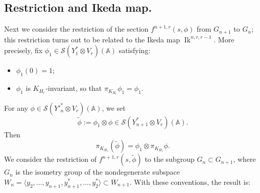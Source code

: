 \documentclass[10pt]{amsart}
\theoremstyle{plain}
\numberwithin{equation}{section}
\begin{document}
 \subsection{\bf Restriction and Ikeda map.}
Next we consider the restriction of the section $f^{n+1,r}(s, \phi)$
from $G_{n+1}$ to $G_n$; this restriction turns out
 to be related to the Ikeda map ${\operatorname{Ik}}^{n,r,r-1}$.
 More precisely, fix $\phi_1  \in \mathcal{S}(Y_1^* \otimes V_r)({\mathbb{A}})$
 satisfying:
 \vskip 5pt
 
 \begin{itemize}
 \item $\phi_1(0) = 1$;
 \item $\phi_1$ is $K_{H_r}$-invariant, so that $\pi_{K_{H_r}} \phi_1 = \phi_1$. 
 \end{itemize}
 \vskip 5pt
 
\noindent  For  any  $\phi \in \mathcal{S}({Y'}_n^* \otimes V_r)({\mathbb{A}})$, we set
 \[  \tilde{\phi} := \phi_1 \otimes \phi \in \mathcal{S}(Y_{n+1}^*
 \otimes V_r)({\mathbb{A}}). \]
 Then 
 \[  \pi_{K_{H_r}}(\tilde{\phi}) = \phi_1 \otimes \pi_{K_{H_r}} \phi. \]
 We consider the restriction of $f^{n+1, r}(s, \tilde{\phi})$ to the
 subgroup $G_n \subset G_{n+1}$, where $G_n$ is the isometry group of
 the nondegenerate subspace $W_n = \langle y_2,...,y_{n+1},
 y_{n+1}^*,...,y_2^* \rangle \subset W_{n+1}$. With these conventions,
 the result is:
 \vskip 5pt
 
\end{document}
